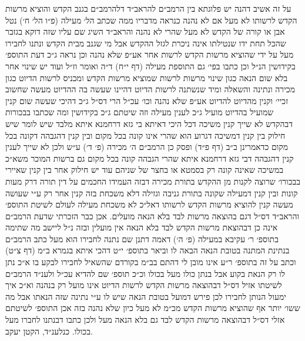 \documentclass[12pt, openany]{book}
\begin{document}
\begin{multicols}{2}
על זה אשיב דהנה יש פלוגתא בין הרמב״ם להראב״ד דלהרמב״ם בגנב הקדש והוציא מרשות הקדש לרשותו לא מעל אם לא נהנה כנראה מדבריו ממה שכתב הל׳ מעילה (פ״ו הל׳ ח׳) נטל אבן או קורה של הקדש לא מעל שהרי לא נהנה והראב״ד השיג שם עליו שזה דוקא בגזבר שהכל תחת ידו שנטילתו אינה ניכרת לגזל ההקדש אבל מי שגנב מבית הקדש ונתנו לחבירו מעל על ידי שהוציא מרשות הקדש לרשות אחר אע״פ שלא נהנה וכן נראה ג״כ דעת התוספ׳ בקידושין הנ״ל וכן כתבו בפי׳ גם התוספת מעילה (דף י״ח) ד״ה ואומר וז״ל ועוד יש שינוי אחר בלא שום הנאה כגון שינוי מרשות לרשות שמוציא מרשות הקדש ומכניס לרשות הדיוט כגון מכירה ונתינה והשאלה ומיד שנשתנה לרשות הדיוט דהיינו שעשה בה ההדיוט מעשה שחשוב זכיי׳ וקנין מהדיוט להדיוט אע״פ שלא נהנה וכו׳ עכ״ל הרי דס״ל ג״כ דהיכי שעשה שום קנין שמועיל בהדיוט מועיל ג״כ לענין מעילה וזה שיטתם ג״כ בקידושין ומה שכתבו בבכורות דבהקדש לא שייך קנין משיכה דכל היכי דאיתא בי גזא דרחמנא איתא מלבד שיש לומר שיש חילוק בין קנין דמשיכה דגרוע הוא שהרי אינו קונה בכל מקום ובין קנין דהגבהה דקונה בכל מקום כדאמרינן ב״ב (דף פ״ד) ופסק כן הרמב״ם ה׳ מכירה (פ׳ ד׳) ע״ש ולכן לא שייך לענין קנין דהגבהה דבי גזא דרחמנא איתא שהרי הגבהה קונה בכל מקום גם ברשות המוכר משא״כ במשיכה שאינה קונה רק בסמטא או בחצר של שניהם עוד יש חילוק אחר בין קנין שאיירי בבכורו׳ שרוצה לקנות מן ההקדש בתורת מכירה דבזה העמידו החכמים על דין תורה דרק מעות קונות ובין קנין דמעילה שקונה בתורת גניבה וגזילה דלא משכחת בזה קנין אחר רק ע״י שעושה מעשה קנין להוציא מרשות הקדש לרשותו דאל״כ לא משכחת מעילה לעולם לשיטת התוספ׳ והראב״ד דס״ל דגם בהוצאה מרשות לבד בלא הנאה מועלים. אכן כבר הזכרתי שדעת הרמב״ם אינה כן דבהוצאת מרשות הקדש לבד בלא הנאה אין מועלין ובזה נ״ל ליישב מה שתימה בתוספ׳ ר׳ עקיבא במעילה (פ׳ ה׳) דאמה דתנן שם נתנה לחבירו הוא מעל כתב הרמב״ם בנתינת המתנה בטובת הנאה הבאה לו וביאר בתוספ׳ י״ט דהכי איתא בגמרא ב״מ (דף צ״ט) וכתב על זה בתוספ׳ ר״ע אינו מובן לי דהתם בב״מ בקורדם שהשאיל לחבירו לבקע בו א״כ נתן לו רק הנאת בקוע אבל בנתן כולו מעל בכולו וכ״כ תוספ׳ שם להדיא עכ״ל ולענ״ד הרמב״ם לשיטתו אזיל דס״ל דבהוצאה מרשות הקדש לרשות הדיוט אינו מועל רק בנהנה וא״כ איך ימעול הנותן לחבירו לכן פירש דמועל בטובת הנאה שיש לו ע״י נתינה שזה הנאתו אבל מה ששו׳ יותר אף שהוציא מרשות הקדש מכ״מ לא מעל כיון שלא נהנה בזה אכן התוספ׳ לשיטתם אזלי דס״ל דבהוצאה מרשות הקדש לבד גם בלא הנאה מעל ולכן כתבו דבנתנו לחברו מעל בכולו. כנלענ״ד, הקטן יעקב.\\\vspace{0pt}

\end{multicols}\newpage
\end{document}
